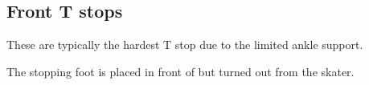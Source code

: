 \subsection*{Front T stops}
\label{drill:t_stop:front}

These are typically the hardest T stop due to the limited ankle support.


The stopping foot is placed in front of but turned out from the skater.

